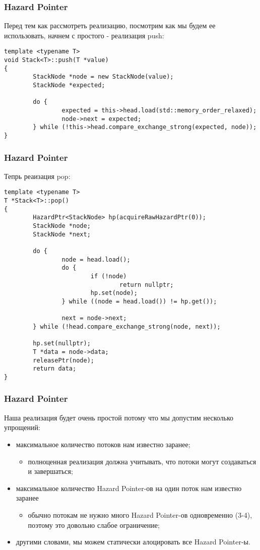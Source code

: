\begin{frame}[fragile]
\frametitle{Hazard Pointer}

Перед тем как рассмотреть реализацию, посмотрим как мы будем ее использовать, начнем с простого - реализация push:

\begin{lstlisting}
template <typename T>
void Stack<T>::push(T *value)
{
        StackNode *node = new StackNode(value);
        StackNode *expected;

        do {
                expected = this->head.load(std::memory_order_relaxed);
                node->next = expected;
        } while (!this->head.compare_exchange_strong(expected, node));
}
\end{lstlisting}
\end{frame}

\begin{frame}[fragile]
\frametitle{Hazard Pointer}

Тепрь реаизация pop:
\begin{lstlisting}
template <typename T>
T *Stack<T>::pop()
{
        HazardPtr<StackNode> hp(acquireRawHazardPtr(0));
        StackNode *node;
        StackNode *next;

        do {
                node = head.load();
                do {
                        if (!node)
                                return nullptr;
                        hp.set(node);
                } while ((node = head.load()) != hp.get());

                next = node->next;
        } while (!head.compare_exchange_strong(node, next));

        hp.set(nullptr);
        T *data = node->data;
        releasePtr(node);
        return data;
}
\end{lstlisting}
\end{frame}

\begin{frame}
\frametitle{Hazard Pointer}
Наша реализация будет очень простой потому что мы допустим несколько упрощений:
\begin{itemize}
  \item максимальное количество потоков нам известно заранее;
    \begin{itemize}
      \item полноценная реализация должна учитывать, что потоки могут создаваться и завершаться;
    \end{itemize}
  \item максимальное количество Hazard Pointer-ов на один поток нам известно заранее
    \begin{itemize}
      \item обычно потокам не нужно много Hazard Pointer-ов одновременно (3-4), поэтому это довольно слабое ограничение;
    \end{itemize}
  \item другими словами, мы можем статически алоцировать все Hazard Pointer-ы.
\end{itemize}
\end{frame}

